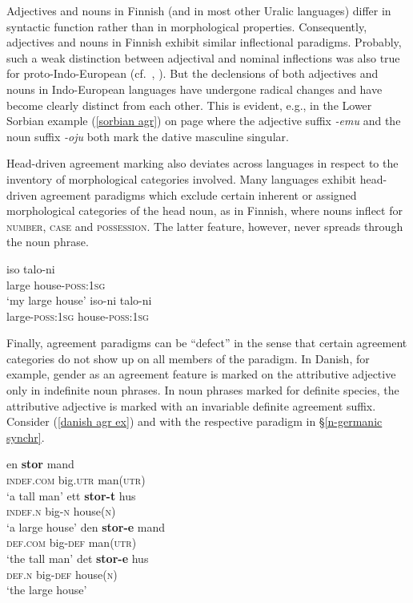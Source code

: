 Adjectives and nouns in Finnish (and in most other Uralic languages) differ in syntactic function rather than in morphological properties. Consequently, adjectives and nouns in Finnish exhibit similar inflectional paradigms. Probably, such a weak distinction between adjectival and nominal inflections was also true for proto-Indo-European (cf.~\citealt[80]{comrie1998}, \citealt[139]{kuriaki2007}). But the declensions of both adjectives and nouns in Indo-European languages have undergone radical changes and have become clearly distinct from each other. This is evident, e.g., in the Lower Sorbian example (\ref{sorbian agr}) on page \pageref{sorbian agr} where the adjective suffix \textit{-emu} and the noun suffix \textit{-oju} both mark the dative masculine singular.

Head-driven agreement marking also deviates across languages in respect to the inventory of morphological categories involved. Many languages exhibit head-driven agreement paradigms which exclude certain inherent or assigned morphological categories of the head noun, as in Finnish, where nouns inflect for \textsc{number}, \textsc{case} and \textsc{possession}. The latter feature, however, never spreads through the noun phrase.
\begin{exe}
\ex
{}
\begin{xlist}
\ex
\gll 	iso		talo-ni\\
	large	house-\textsc{poss:1sg}\\
\glt	‘my large house’
\ex
\gll 	*iso-ni	talo-ni\\
	large-\textsc{poss:1sg}	house-\textsc{poss:1sg}\\
\end{xlist}
\end{exe}
Finally, agreement paradigms can be “defect” in the sense that certain agreement categories do not show up on all members of the paradigm. In Danish, for example, gender as an agreement feature is marked on the attributive adjective only in indefinite noun phrases. In noun phrases marked for definite species, the attributive adjective is marked with an invariable definite agreement suffix. Consider (\ref{danish agr ex}) and  with the respective paradigm in \S\ref{n-germanic synchr}.
\begin{exe}
\ex 
{} \label{danish agr ex}
\begin{xlist}
\ex
\gll en \textbf{stor} mand\\
	\textsc{indef.com} big.\textsc{utr} man(\textsc{utr})\\
\glt	‘a tall man’
\ex
\gll ett \textbf{stor-t} hus\\
	\textsc{indef.n} big-\textsc{n} house(\textsc{n})\\
\glt	‘a large house’
\ex	
\gll den \textbf{stor-e} mand\\
	\textsc{def.com} big-\textsc{def} man(\textsc{utr})\\
\glt	‘the tall man’
\ex
\gll det \textbf{stor-e} hus\\
	\textsc{def.n} big-\textsc{def} house(\textsc{n})\\
\glt	‘the large house’
\end{xlist}
\end{exe}
